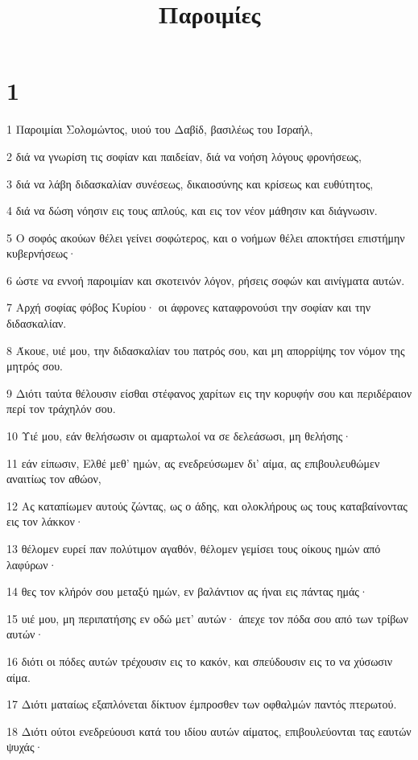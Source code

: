 

\title{Παροιμίες}


\chapter{1}

\par 1 Παροιμίαι Σολομώντος, υιού του Δαβίδ, βασιλέως του Ισραήλ,
\par 2 διά να γνωρίση τις σοφίαν και παιδείαν, διά να νοήση λόγους φρονήσεως,
\par 3 διά να λάβη διδασκαλίαν συνέσεως, δικαιοσύνης και κρίσεως και ευθύτητος,
\par 4 διά να δώση νόησιν εις τους απλούς, και εις τον νέον μάθησιν και διάγνωσιν.
\par 5 Ο σοφός ακούων θέλει γείνει σοφώτερος, και ο νοήμων θέλει αποκτήσει επιστήμην κυβερνήσεως·
\par 6 ώστε να εννοή παροιμίαν και σκοτεινόν λόγον, ρήσεις σοφών και αινίγματα αυτών.
\par 7 Αρχή σοφίας φόβος Κυρίου· οι άφρονες καταφρονούσι την σοφίαν και την διδασκαλίαν.
\par 8 Άκουε, υιέ μου, την διδασκαλίαν του πατρός σου, και μη απορρίψης τον νόμον της μητρός σου.
\par 9 Διότι ταύτα θέλουσιν είσθαι στέφανος χαρίτων εις την κορυφήν σου και περιδέραιον περί τον τράχηλόν σου.
\par 10 Υιέ μου, εάν θελήσωσιν οι αμαρτωλοί να σε δελεάσωσι, μη θελήσης·
\par 11 εάν είπωσιν, Ελθέ μεθ' ημών, ας ενεδρεύσωμεν δι' αίμα, ας επιβουλευθώμεν αναιτίως τον αθώον,
\par 12 Ας καταπίωμεν αυτούς ζώντας, ως ο άδης, και ολοκλήρους ως τους καταβαίνοντας εις τον λάκκον·
\par 13 θέλομεν ευρεί παν πολύτιμον αγαθόν, θέλομεν γεμίσει τους οίκους ημών από λαφύρων·
\par 14 θες τον κλήρόν σου μεταξύ ημών, εν βαλάντιον ας ήναι εις πάντας ημάς·
\par 15 υιέ μου, μη περιπατήσης εν οδώ μετ' αυτών· άπεχε τον πόδα σου από των τρίβων αυτών·
\par 16 διότι οι πόδες αυτών τρέχουσιν εις το κακόν, και σπεύδουσιν εις το να χύσωσιν αίμα.
\par 17 Διότι ματαίως εξαπλόνεται δίκτυον έμπροσθεν των οφθαλμών παντός πτερωτού.
\par 18 Διότι ούτοι ενεδρεύουσι κατά του ιδίου αυτών αίματος, επιβουλεύονται τας εαυτών ψυχάς·
